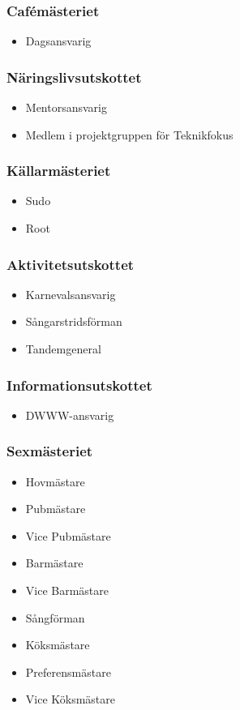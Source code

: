 \documentclass{dsekkallelse}
\begin{document}
\begin{multicols}{2}

\subsubsection{Cafémästeriet}
\begin{itemize}
    \item Dagsansvarig
\end{itemize}

\subsubsection{Näringslivsutskottet}
\begin{itemize}
    \item Mentorsansvarig
    \item Medlem i projektgruppen för Teknikfokus 
\end{itemize}

\subsubsection{Källarmästeriet}
\begin{itemize}
    \item Sudo
    \item Root
\end{itemize}

\subsubsection{Aktivitetsutskottet}
 \begin{itemize}
     \item Karnevalsansvarig
     \item Sångarstridsförman
     \item Tandemgeneral
 \end{itemize}
 
\subsubsection{Informationsutskottet}
\begin{itemize}
    \item DWWW-ansvarig
\end{itemize}
 
 \subsubsection{Sexmästeriet}
\begin{itemize}
    \item Hovmästare
    \item Pubmästare
    \item Vice Pubmästare
    \item Barmästare
    \item Vice Barmästare
    \item Sångförman
    \item Köksmästare
    \item Preferensmästare
    \item Vice Köksmästare
\end{itemize}


\end{multicols}
\end{document}
